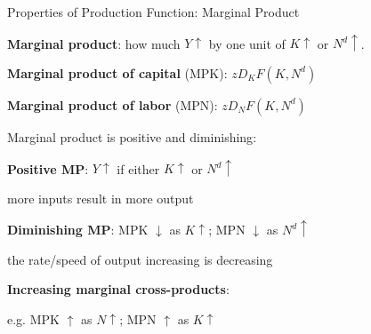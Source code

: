 \documentclass[11pt,aspectratio=169,usenames,dvipsnames]{beamer}
\let\tempone\itemize
\let\temptwo\enditemize
\renewenvironment{itemize}{\tempone\addtolength{\itemsep}{\fill}}{\temptwo}
\begin{document}
\begin{frame}{Properties of Production Function: Marginal Product}
\label{slide:Properties_of_Production_Function__Marginal_Product}
\begin{itemize}
    \item  \textbf{Marginal product}: how much $ Y \uparrow $ by one unit of $ K \uparrow  $ or $ N^{d} \uparrow $.
    \begin{itemize}
        \item \textbf{Marginal product of capital} (MPK): $z D_{K}F( K, N^{d} )$
        \item \textbf{Marginal product of labor} (MPN): $z D_{N}F( K, N^{d} )$
    \end{itemize}
    \item Marginal product is \alert{positive} and \alert{diminishing}:
    \begin{itemize}
        \item \textbf{Positive MP}: $ Y \uparrow  $ if either $ K\uparrow  $ or $ N^{d} \uparrow  $
        \begin{itemize}
            \item more inputs result in more output
        \end{itemize}
        \item \textbf{Diminishing MP}: MPK $ \downarrow  $ as $ K \uparrow  $; MPN $ \downarrow  $ as $ N^{d}  \uparrow  $
        \begin{itemize}
            \item the \alert{rate/speed} of output increasing is decreasing
        \end{itemize}
    \end{itemize}
    \item \textbf{Increasing marginal cross-products}:
    \begin{itemize}
        \item e.g. MPK $ \uparrow  $ as $ N \uparrow  $; MPN $ \uparrow  $ as $ K \uparrow  $
    \end{itemize}
\end{itemize}
\end{frame}
\end{document}
